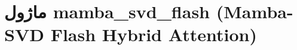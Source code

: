 \section{ماژول mamba\_svd\_flash (Mamba-SVD Flash Hybrid Attention)}
\label{sec:module_mamba_svd_flash}

